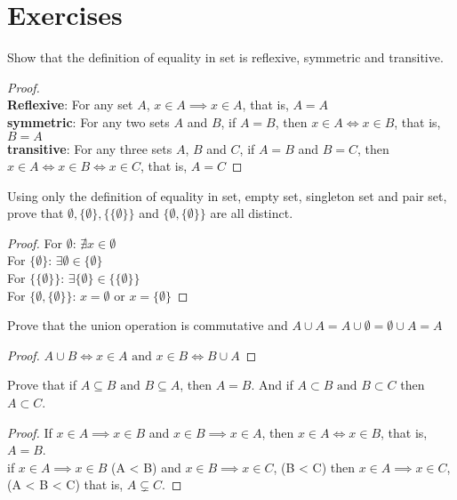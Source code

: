 \section{Exercises}

\begin{exercise}
  Show that the definition of equality in set is reflexive, symmetric and transitive.
\end{exercise}
\begin{proof}
  \\ \textbf{Reflexive}: For any set $A$, $x \in A \implies x \in A$, that is, $A = A$ \\
  \textbf{symmetric}: For any two sets $A$ and $B$, if $A = B$, then $x \in A \iff x \in B$, that is, $B = A$ \\
  \textbf{transitive}: For any three sets $A$, $B$ and $C$, if $A = B$ and $B = C$, then $x \in A \iff x \in B \iff x \in C$, that is, $A = C$
\end{proof}

\begin{exercise}
  Using only the definition of equality in set, empty set, singleton set and pair set, prove that $\emptyset, \{\emptyset\}, \{\{\emptyset\}\}$ and $\{\emptyset, \{\emptyset\}\}$
  are all distinct.
\end{exercise}
\begin{proof}
  For $\emptyset$: $\nexists x \in \emptyset$ \\
  For $\{\emptyset\}$: $\exists \emptyset \in \{\emptyset\}$ \\ 
  For $\{\{\emptyset\}\}$: $\exists \{\emptyset\} \in \{\{\emptyset\}\}$ \\
  For $\{\emptyset, \{\emptyset\}\}$: $x = \emptyset \text{\ or\ } x = \{\emptyset\}$
\end{proof}

\begin{exercise}
  Prove that the union operation is commutative and $A \cup A = A \cup \emptyset = \emptyset \cup A = A$
\end{exercise}
\begin{proof}
  $A \cup B \iff x \in A \text{\ and\ } x \in B \iff B \cup A$
\end{proof}

\begin{exercise}
  Prove that if $A \subseteq B \text{\ and\ } B \subseteq A$, then $A = B$. And if $A \subset B \text{\ and\ } B \subset C$ then $A \subset C$.
\end{exercise}
\begin{proof}
  If $x \in A \implies x \in B$ and $x \in B \implies x \in A$, then $x \in A \iff x \in B$, that is, $A = B$. \\
  if $x \in A \implies x \in B$ (A < B) and $x \in B \implies x \in C$, (B < C) 
  then $x \in A \implies x \in C$, (A < B < C) that is, $A \subsetneq C$.
\end{proof}

